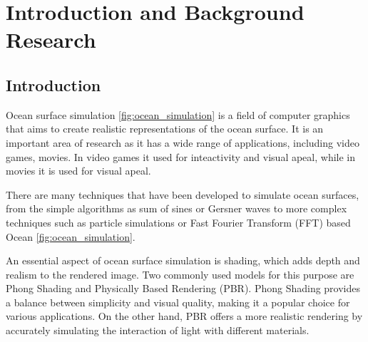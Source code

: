 \justifying
\chapter{Introduction and Background Research}



\label{chapter1}


\section{Introduction}
Ocean surface simulation \ref{fig:ocean_simulation} is a field of computer graphics that aims to create realistic representations of the ocean surface.
It is an important area of research as it has a wide range of applications, including video games, movies.
In video games it used for inteactivity and visual apeal, while in movies it is used for visual apeal. 

There are many techniques that have been developed to simulate ocean surfaces, from the simple algorithms as 
sum of sines or Gersner waves to more complex techniques such as particle simulations or Fast Fourier Transform (FFT) based Ocean \ref{fig:ocean_simulation}.

An essential aspect of ocean surface simulation is shading, which adds depth and realism to the rendered image. Two commonly used models for this purpose are Phong Shading and Physically Based Rendering (PBR). Phong Shading provides a balance between simplicity and visual quality, making it a popular choice for various applications. On the other hand, PBR offers a more realistic rendering by accurately simulating the interaction of light with different materials.

